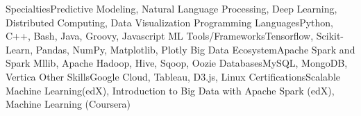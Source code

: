 \begin{cvskills}
\cvskill
{Specialties}{Predictive Modeling, Natural Language Processing, Deep Learning, Distributed Computing, Data Visualization}
\cvskill
{Programming Languages}{Python, C++, Bash, Java, Groovy, Javascript}
\cvskill
{ML Tools/Frameworks}{Tensorflow, Scikit-Learn, Pandas, NumPy, Matplotlib, Plotly}
\cvskill
{Big Data Ecosystem}{Apache Spark and Spark Mllib, Apache Hadoop, Hive, Sqoop, Oozie}
\cvskill
{Databases}{MySQL, MongoDB, Vertica}
\cvskill
{Other Skills}{Google Cloud, Tableau, D3.js, Linux}
\cvskill
{Certifications}{Scalable Machine Learning(edX), Introduction to Big Data with Apache Spark (edX), Machine Learning (Coursera)}
\end{cvskills}

